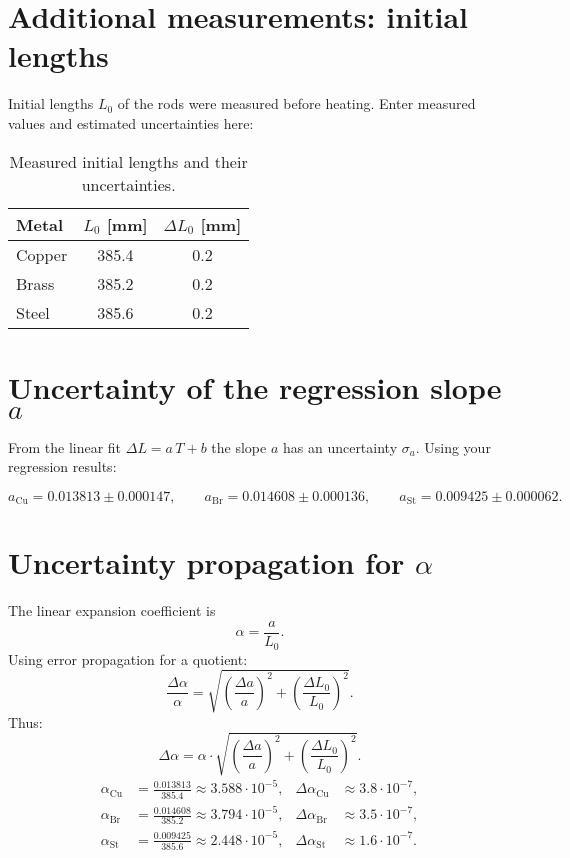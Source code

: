 \section{Additional measurements: initial lengths}

Initial lengths \(L_0\) of the rods were measured before heating. Enter measured values and estimated uncertainties here:

\begin{table}[H]
\centering
\begin{tabular}{l c c}
\toprule
Metal & $L_0$ [mm] & $\Delta L_0$ [mm] \\
\midrule
Copper & 385.4 & 0.2 \\
Brass  & 385.2 & 0.2 \\
Steel  & 385.6 & 0.2 \\
\bottomrule
\end{tabular}
\caption{Measured initial lengths and their uncertainties.}
\end{table}

\section{Uncertainty of the regression slope \(a\)}

From the linear fit \(\Delta L = a\,T + b\) the slope \(a\) has an uncertainty \(\sigma_a\). Using your regression results:

\[
a_{\mathrm{Cu}} = 0.013813 \pm 0.000147,\qquad
a_{\mathrm{Br}} = 0.014608 \pm 0.000136,\qquad
a_{\mathrm{St}} = 0.009425 \pm 0.000062.
\]

\section{Uncertainty propagation for \(\alpha\)}

The linear expansion coefficient is
\[
\alpha = \frac{a}{L_0}.
\]
Using error propagation for a quotient:
\[
\frac{\Delta\alpha}{\alpha}
= \sqrt{\left(\frac{\Delta a}{a}\right)^2 + \left(\frac{\Delta L_0}{L_0}\right)^2 }.
\]
Thus:
\[
\Delta\alpha = \alpha \cdot
\sqrt{\left(\frac{\Delta a}{a}\right)^2 + \left(\frac{\Delta L_0}{L_0}\right)^2 } .
\]
\vspace{1cm}  %
\[
\begin{aligned}
\alpha_{\mathrm{Cu}} &= \frac{0.013813}{385.4} \approx 3.588 \cdot 10^{-5}, & \Delta\alpha_{\mathrm{Cu}} &\approx 3.8 \cdot 10^{-7}, \\
\alpha_{\mathrm{Br}} &= \frac{0.014608}{385.2} \approx 3.794 \cdot 10^{-5}, & \Delta\alpha_{\mathrm{Br}} &\approx 3.5 \cdot 10^{-7}, \\
\alpha_{\mathrm{St}} &= \frac{0.009425}{385.6} \approx 2.448 \cdot 10^{-5}, & \Delta\alpha_{\mathrm{St}} &\approx 1.6 \cdot 10^{-7}.
\end{aligned}
\]

